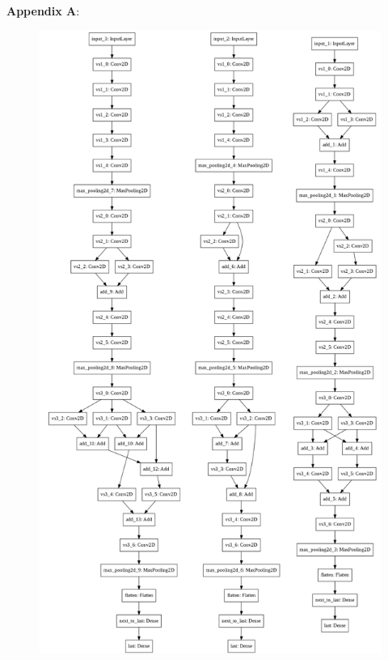 \documentclass[eng]{simposium}
\begin{document}
\newpage

\textbf{Appendix A}:
\begin{figure}[!ht] 
  \centering 
  \includegraphics[height=0.94\textheight]{arhitekture_HD.png} 
  \label{fig:architectures_HD} 
\end{figure} 
\end{document}
